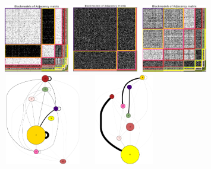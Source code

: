 \begin{figure}[h]
	\centering
	
	\includegraphics[width=2.94cm, height=3cm]{img/M_g_peaks/figure_6}
	\endminipage
	\includegraphics[width=2.94cm, height=3cm]{img/M_g_power_law/figure_6}
	\endminipage
	\includegraphics[width=2.94cm, height=3cm]{img/M_g_regular/figure_6}
	\endminipage
    \vspace{0.3cm}
	\includegraphics[width=3.5cm, height=4cm]{img/M_g_peaks/graph_dot}
	\endminipage
	\includegraphics[width=3.5cm, height=4cm]{img/M_g_power_law/graph_dot} 

\end{figure}
